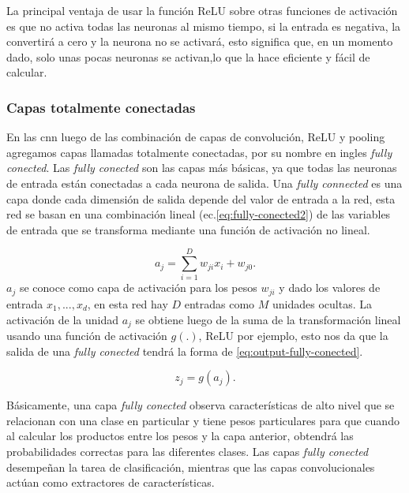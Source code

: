 La principal ventaja de usar la función ReLU sobre otras funciones de activación es que no activa todas las neuronas al mismo tiempo, si la entrada es negativa, la convertirá a cero y la neurona no se activará, esto significa que, en un momento dado, solo unas pocas neuronas se activan,lo que la hace eficiente y fácil de calcular.


\subsubsection{Capas totalmente conectadas}\label{sub:fully_connected}

En las \ac{cnn} luego de las combinación de capas de convolución, ReLU y pooling agregamos capas llamadas totalmente conectadas, por su nombre en ingles \textit{fully conected}.
Las \textit{fully conected} son las capas más básicas, ya que todas las neuronas de entrada están conectadas a cada neurona de salida. Una \textit{fully connected }  es una capa donde cada dimensión de salida  depende del valor de entrada a la red, esta red se basan en una combinación lineal (ec.\eqref{eq:fully-conected2}) de las variables de entrada que se transforma mediante una función de activación no lineal.


\begin{equation}\label{eq:fully-conected2}
a_j = \sum_{i=1}^D w_{ji}  x_i + w_{j0}.
\end{equation}
$ a_j$  se conoce como capa de activación para los pesos $w_{ji}$ y dado los valores de entrada ${x_1,...,x_d}$, en esta red hay  $ D$ entradas como $M$ unidades ocultas. La activación de la unidad  $ a_j$ se obtiene luego de la suma de la transformación lineal usando una función de activación $ g(.)$, ReLU por ejemplo, esto nos da que la salida de una \textit{fully conected} tendrá la forma de  \eqref{eq:output-fully-conected}.

\begin{equation}\label{eq:output-fully-conected}
z_j = g(a_j).
\end{equation}

Básicamente, una capa \textit{fully conected} observa características de alto nivel que se relacionan con una clase en particular y tiene pesos particulares para que cuando al calcular los productos entre los pesos y la capa anterior, obtendrá las probabilidades correctas para las diferentes clases. Las capas \textit{fully conected }desempeñan  la tarea de clasificación, mientras que las capas convolucionales actúan como extractores de características.

